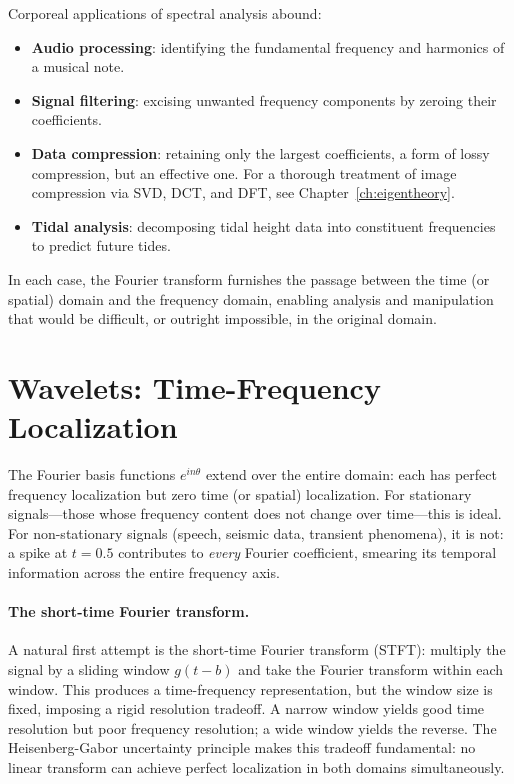 \documentclass[12pt,a4paper]{report}
\theoremstyle{thms}
\theoremstyle{defns}
\begin{document}
Corporeal applications of spectral analysis abound:
\begin{itemize}
    \item \textbf{Audio processing}: identifying the fundamental frequency and harmonics of a musical note.
    \item \textbf{Signal filtering}: excising unwanted frequency components by zeroing their coefficients.
    \item \textbf{Data compression}: retaining only the largest coefficients, a form of lossy compression, but an effective one. For a thorough treatment of image compression via SVD, DCT, and DFT, see Chapter~\ref{ch:eigentheory}.
    \item \textbf{Tidal analysis}: decomposing tidal height data into constituent frequencies to predict future tides.
\end{itemize}

In each case, the Fourier transform furnishes the passage between the time (or spatial) domain and the frequency domain, enabling analysis and manipulation that would be difficult, or outright impossible, in the original domain.

\section{Wavelets: Time-Frequency Localization}
\label{sec:wavelets}

The Fourier basis functions $e^{in\theta}$ extend over the entire domain: each has perfect frequency localization but zero time (or spatial) localization. For stationary signals—those whose frequency content does not change over time—this is ideal. For non-stationary signals (speech, seismic data, transient phenomena), it is not: a spike at $t = 0.5$ contributes to \textit{every} Fourier coefficient, smearing its temporal information across the entire frequency axis.

\paragraph{The short-time Fourier transform.} A natural first attempt is the short-time Fourier transform (STFT): multiply the signal by a sliding window $g(t - b)$ and take the Fourier transform within each window. This produces a time-frequency representation, but the window size is fixed, imposing a rigid resolution tradeoff. A narrow window yields good time resolution but poor frequency resolution; a wide window yields the reverse. The Heisenberg-Gabor uncertainty principle makes this tradeoff fundamental: no linear transform can achieve perfect localization in both domains simultaneously.
\end{document}
